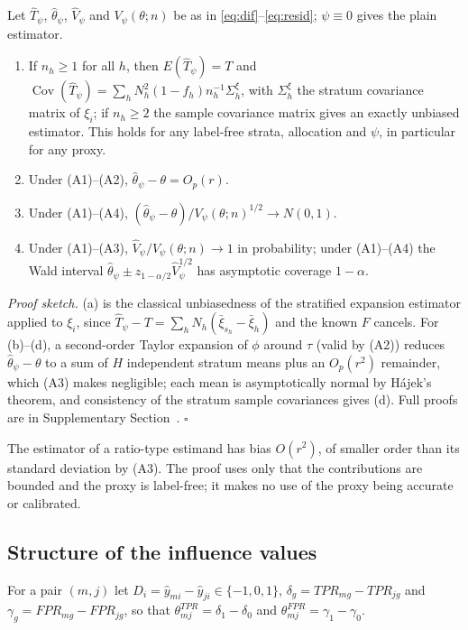 \begin{proposition}[Validity]\label{prop:validity}
Let $\hat T_\psi$, $\hat\theta_\psi$, $\hat V_\psi$ and $V_\psi(\theta;n)$ be as in \eqref{eq:dif}--\eqref{eq:resid}; $\psi\equiv0$
gives the plain estimator.
\begin{enumerate}
\item[(a)] If $n_h\ge1$ for all $h$, then $E(\hat T_\psi)=T$ and
$\operatorname{Cov}(\hat T_\psi)=\sum_hN_h^2(1-f_h)n_h^{-1}\Sigma^\xi_h$, with $\Sigma^\xi_h$ the stratum covariance matrix of
$\xi_i$; if $n_h\ge2$ the sample covariance matrix gives an exactly unbiased estimator. This holds for any label-free strata, allocation and
$\psi$, in particular for any proxy.
\item[(b)] Under (A1)--(A2), $\hat\theta_\psi-\theta=O_p(r)$.
\item[(c)] Under (A1)--(A4), $(\hat\theta_\psi-\theta)/V_\psi(\theta;n)^{1/2}\to N(0,1)$.
\item[(d)] Under (A1)--(A3), $\hat V_\psi/V_\psi(\theta;n)\to1$ in probability; under (A1)--(A4) the Wald interval
$\hat\theta_\psi\pm z_{1-\alpha/2}\hat V_\psi^{1/2}$ has asymptotic coverage $1-\alpha$.
\end{enumerate}
\end{proposition}

\emph{Proof sketch.} (a) is the classical unbiasedness of the stratified expansion estimator applied to $\xi_i$, since
$\hat T_\psi-T=\sum_hN_h(\bar\xi_{s_h}-\bar\xi_h)$ and the known $F$ cancels. For (b)--(d), a second-order Taylor expansion of $\phi$
around $\tau$ (valid by (A2)) reduces $\hat\theta_\psi-\theta$ to a sum of $H$ independent stratum means plus an $O_p(r^2)$ remainder,
which (A3) makes negligible; each mean is asymptotically normal by H\'ajek's theorem, and consistency of the stratum sample covariances gives (d).
Full proofs are in Supplementary Section~. $\square$

The estimator of a ratio-type estimand has bias $O(r^2)$, of smaller order than its standard deviation by (A3). The proof
uses only that the contributions are bounded and the proxy is label-free; it makes no use of the proxy being accurate or calibrated.

\subsection{Structure of the influence values}\label{sec:theory-structure}

For a pair $(m,j)$ let $D_i=\hat y_{mi}-\hat y_{ji}\in\{-1,0,1\}$, $\delta_g=TPR_{mg}-TPR_{jg}$ and
$\gamma_g=FPR_{mg}-FPR_{jg}$, so that $\theta^{TPR}_{mj}=\delta_1-\delta_0$ and $\theta^{FPR}_{mj}=\gamma_1-\gamma_0$.

